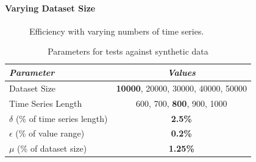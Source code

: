 \paragraph{Varying Dataset Size}
\begin{figure}[!tb]
 \centering
 \caption{Efficiency with varying numbers of time series.}
 \label{fig:exp4}
\end{figure}

\begin{table}[!ht]
\centering
\caption{Parameters for tests against synthetic data}
\begin{small}
\begin{tabular}{lc} 
\hline
{\em Parameter} &{\em Values} \\
\hline
Dataset Size & \textbf{10000}, 20000, 30000, 40000, 50000 \\
Time Series Length & 600, 700, \textbf{800}, 900, 1000 \\
$\delta$ (\% of time series length) & \textbf{2.5\%} \\
$\epsilon$ (\% of value range) & \textbf{0.2\%} \\
$\mu$ (\% of dataset size) & \textbf{1.25\%} \\
\hline
\end{tabular}
\end{small}
\label{tab:parameters2}
\end{table}

